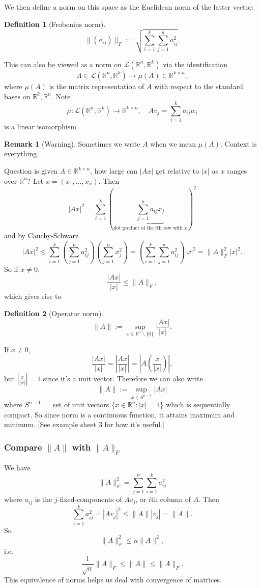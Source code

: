 \documentclass[a4paper]{article}
\theoremstyle{definition}
\newtheorem{defn}{Definition}[subsection]
\newtheorem*{remark}{Remark}
\begin{document}
We then define a norm on this space as the Euclidean norm of the latter vector:
\begin{defn}[Frobenius norm]
\[
\|(a_{ij})\|_{F}:={\sqrt {\sum _{i=1}^{k}\sum _{j=1}^{n}a_{ij}^{2}}} .
\]
\end{defn}
This can also be viewed as a norm on $\mathcal L(\mathbb R^n,\mathbb R^k)$ via the identification
\[
A\in \mathcal L(\mathbb R^n,\mathbb R^k) \rightarrow \mu (A) \in \mathbb R^{k\times n},
\]
where $\mu(A)$ is the matrix representation of $A$ with respect to the standard bases on $\mathbb R^k,\mathbb R^n$. Note
\[
\mu:\mathcal L(\mathbb R^n,\mathbb R^k) \rightarrow \mathbb R^{k\times n},\quad Av_j=\sum_{i=1}^k a_{ij}w_i
\]
is a linear isomorphism.
\begin{remark}[Warning]
Sometimes we write $A$ when we mean $\mu(A)$. Context is everything.
\end{remark}
Question is given $A\in \mathbb R^{k\times n}$, how large can $|Ax|$ get relative to $|x|$ as $x$ ranges over $\mathbb R^n$? Let $x=(x_1,\ldots,x_n)$. Then
\[
|Ax|^2=\sum_{i=1}^k \left(\underbrace{\sum_{j=1}^n a_{ij}x_j}_{\text{dot product of the $i$th row with $x$}}\right)^2
\]
and by Cauchy-Schwarz
\[
|Ax|^2 \leq \sum_{i=1}^k \left(\sum_{j=1}^n a_{ij}^2\right) \left(\sum_{j=1}^n x_j^2\right)=\left(\sum_{i=1}^k \sum_{j=1}^n a_{ij}^2\right) |x|^2 = \|A\|_F^2 |x|^2.
\]
So if $x\neq 0$,
\[
\frac{|Ax|}{|x|} \leq \|A\|_F,
\]
which gives rise to
\begin{defn}[Operator norm]
\[
\|A\| := \underset{x\in \mathbb R^n\backslash\{0\}}{\sup} \frac{|Ax|}{|x|} .
\]
\end{defn}
If $x\neq 0$,
\[
\frac{|Ax|}{|x|}=\left|\frac{Ax}{|x|}\right|=\left|A\left(\frac{x}{|x|}\right)\right|,
\]
but $\left|\frac{x}{|x|}\right|=1$ since it's a unit vector. Therefore we can also write
\[
\|A\|:=\underset{x\in S^{n-1}}{\sup} |Ax|
\]
where $S^{n-1}=$ set of unit vectors $\{x\in \mathbb R^n:|x|=1\}$ which is sequentially compact. So since norm is a continuous function, it attains maximum and minimum. [See example sheet 3 for how it's useful.]

\subsubsection{Compare $\|A\|$ with $\|A\|_F$}
We have
\[
\|A\|_F^2 = \sum_{j=1}^n \sum_{i=1}^k a_{ij}^2
\]
where $a_{ij}$ is the $j$-fixed-components of $Av_j$, or $i$th column of $A$. Then
\[
\sum_{i=1}^k a_{ij}^2=|Av_j|^2 \leq \|A\||v_j|=\|A\| .
\]
So
\[
\|A\|_F^2 \leq n \|A\|^2 ,
\]
i.e.
\[
\frac{1}{\sqrt n} \|A\|_F \leq \|A\| \leq \|A\|_F .
\]
This equivalence of norms helps us deal with convergence of matrices.
\end{document}
